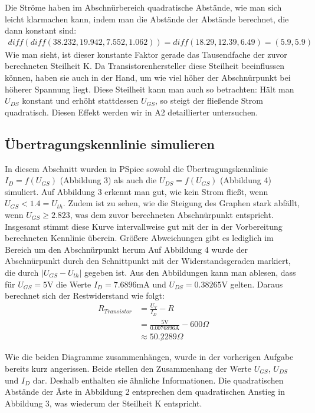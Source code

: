 \documentclass[12pt,a4paper]{scrartcl}
\begin{document}
Die Str\"ome haben im Abschn\"urbereich quadratische Abst\"ande, wie man sich leicht klarmachen kann, indem man die Abst\"ande der Abst\"ande berechnet, die dann konstant sind:
\begin{align*}
diff(diff(38.232, 19.942, 7.552, 1.062)) = diff(18.29, 12.39, 6.49) = (5.9, 5.9)
\end{align*}
Wie man sieht, ist dieser konstante Faktor gerade das Tausendfache der zuvor berechneten Steilheit K.
Da Transistorenhersteller diese Steilheit beeinflussen k\"onnen, haben sie auch in der Hand, um wie viel h\"oher der Abschn\"urpunkt bei h\"oherer Spannung liegt.
Diese Steilheit kann man auch so betrachten:
H\"alt man $U_{DS}$ konstant und erh\"oht stattdessen $U_{GS}$, so steigt der flie\ss ende Strom quadratisch.
Diesen Effekt werden wir in A2 detaillierter untersuchen.

\subsection{\"Ubertragungskennlinie simulieren}
In diesem Abschnitt wurden in PSpice sowohl die \"Ubertragungskennlinie $I_D=f(U_{GS})$ (Abbildung 3) als auch die $U_{DS}=f(U_{GS})$ (Abbildung 4) simuliert.
Auf Abbildung 3 erkennt man gut, wie kein Strom flie\ss t, wenn $U_{GS} < 1.4=U_{th}$.
Zudem ist zu sehen, wie die Steigung des Graphen stark abf\"allt, wenn $U_{GS} \geq 2.823$, was dem zuvor berechneten Abschn\"urpunkt entspricht.
Insgesamt stimmt diese Kurve intervallweise gut mit der in der Vorbereitung berechneten Kennlinie \"uberein.
Gr\"o\ss ere Abweichungen gibt es lediglich im Bereich um den Abschn\"urpunkt herum
Auf Abbildung 4 wurde der Abschn\"urpunkt durch den Schnittpunkt mit der Widerstandsgeraden markiert, die durch $|U_{GS} - U_{th}|$ gegeben ist.
Aus den Abbildungen kann man ablesen, dass f\"ur $U_{GS} = 5$V die Werte $I_D = 7.6896$mA und $U_{DS} = 0.38265$V gelten.
Daraus berechnet sich der Restwiderstand wie folgt:
\begin{align*}
R_{Transistor} & = \frac{U_V}{I_D} -R\\
& = \frac{5\text{V}}{0.0076896\text{A}} - 600\Omega \\
& \underline{ \approx 50.2289\Omega}
\end{align*}

Wie die beiden Diagramme zusammenh\"angen, wurde in der vorherigen Aufgabe bereits kurz angerissen.
Beide stellen den Zusammenhang der Werte $U_{GS}$, $U_{DS}$ und $I_D$ dar.
Deshalb enthalten sie \"ahnliche Informationen.
Die quadratischen Abst\"ande der \"Aste in Abbildung 2 entsprechen dem quadratischen Anstieg in Abbildung 3, was wiederum der Steilheit K entspricht.
\end{document}
